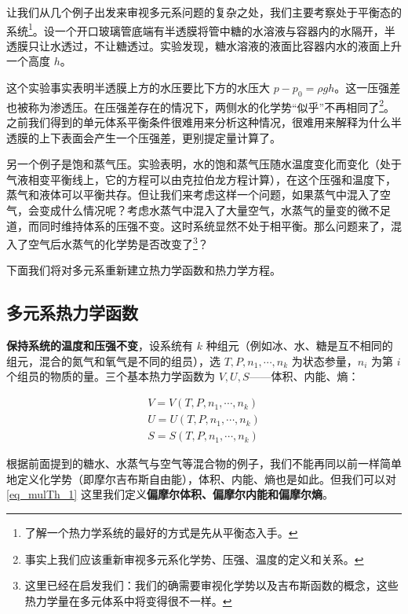 
让我们从几个例子出发来审视多元系问题的复杂之处，我们主要考察处于平衡态的系统\footnote{了解一个热力学系统的最好的方式是先从平衡态入手。}。设一个开口玻璃管底端有半透膜将管中糖的水溶液与容器内的水隔开，半透膜只让水透过，不让糖透过。实验发现，糖水溶液的液面比容器内水的液面上升一个高度 $h$。

这个实验事实表明半透膜上方的水压要比下方的水压大 $p-p_0=\rho g h$。这一压强差也被称为渗透压。在压强差存在的情况下，两侧水的化学势“似乎”不再相同了\footnote{事实上我们应该重新审视多元系化学势、压强、温度的定义和关系。}。之前我们得到的单元体系平衡条件很难用来分析这种情况，很难用来解释为什么半透膜的上下表面会产生一个压强差，更别提定量计算了。

另一个例子是饱和蒸气压。实验表明，水的饱和蒸气压随水温度变化而变化（处于气液相变平衡线上，它的方程可以由克拉伯龙方程计算），在这个压强和温度下，蒸气和液体可以平衡共存。但让我们来考虑这样一个问题，如果蒸气中混入了空气，会变成什么情况呢？考虑水蒸气中混入了大量空气，水蒸气的量变的微不足道，而同时维持体系的压强不变。这时系统显然不处于相平衡。那么问题来了，混入了空气后水蒸气的化学势是否改变了\footnote{这里已经在启发我们：我们的确需要审视化学势以及吉布斯函数的概念，这些热力学量在多元体系中将变得很不一样。}？

下面我们将对多元系重新建立热力学函数和热力学方程。

\subsection{多元系热力学函数}

\textbf{保持系统的温度和压强不变}，设系统有 $k$ 种组元（例如冰、水、糖是互不相同的组元，混合的氮气和氧气是不同的组员），选 $T,P,n_1,\cdots,n_k$ 为状态参量，$n_i$ 为第 $i$ 个组员的物质的量。三个基本热力学函数为 $V,U,S$——体积、内能、熵：

\begin{equation}\label{eq_mulTh_1}
\begin{aligned}
V=V(T,P,n_1,\cdots,n_k)\\
U=U(T,P,n_1,\cdots,n_k)\\
S=S(T,P,n_1,\cdots,n_k)
\end{aligned}
\end{equation}

根据前面提到的糖水、水蒸气与空气等混合物的例子，我们不能再同以前一样简单地定义化学势（即摩尔吉布斯自由能），体积、内能、熵也是如此。但我们可以对\autoref{eq_mulTh_1}  这里我们定义\textbf{偏摩尔体积、偏摩尔内能和偏摩尔熵}。

